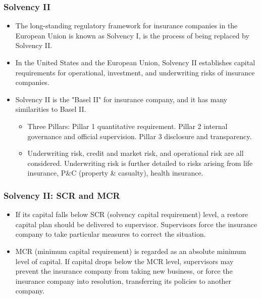 \subsubsection{Solvency II}
\begin{itemize}
\item The long-standing regulatory framework for insurance companies in the European Union is known as Solvency I, is the process of being replaced by Solvency II.
\item In the United States and the European Union, Solvency II establishes capital requirements for operational, investment, and underwriting risks of insurance companies.
\item Solvency II is the "Basel II" for insurance company, and it has many similarities to Basel II.
    \begin{itemize}
    \item Three Pillars: Pillar 1 quantitative requirement. Pillar 2 internal governance and official supervision. Pillar 3 disclosure and transparency.
    \item Underwriting risk, credit and market risk, and operational risk are all considered. Underwriting risk is further detailed to risks arising from life insurance, P\&C (property \& casualty), health insurance.
    \end{itemize}

\end{itemize}



\subsubsection{Solvency II: SCR and MCR}
\begin{itemize}
\item If its capital falls below SCR (solvency capital requirement) level, a restore capital plan should be delivered to supervisor. Supervisors force the insurance company to take particular measures to correct the situation.
\item MCR (minimum capital requirement) is regarded as an absolute minimum level of capital. If capital drops below the MCR level, supervisors may prevent the insurance company from taking new business, or force the insurance company into resolution, transferring its policies to another company.
\end{itemize}



